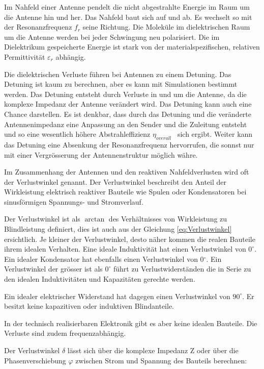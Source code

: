 Im Nahfeld einer Antenne pendelt die nicht abgestrahlte Energie im Raum um die Antenne hin und her. Das Nahfeld baut sich auf und ab. Es wechselt so mit der Resonanzfrequenz $f_r$ seine Richtung. Die Moleküle im dielektrischen Raum um die Antenne werden bei jeder Schwingung neu polarisiert.
Die im Dielektrikum gespeicherte Energie ist stark von der materialspezifischen, relativen Permittivität $\varepsilon_r $ abhängig. 

Die dielektrischen Verluste führen bei Antennen  zu einem Detuning. Das Detuning ist kaum zu berechnen, aber es kann mit Simulationen bestimmt werden. Das Detuning entsteht durch Verluste in und um die  Antenne, da die komplexe Impedanz der Antenne verändert wird. Das Detuning kann auch eine Chance darstellen. Es ist denkbar, dass durch das Detuning und die veränderte Antennenimpedanz eine Anpassung an den Sender und die Zuleitung entsteht und so eine wesentlich höhere Abstrahleffizienz $\eta_{overall}$ \ sich ergibt. Weiter kann das Detuning eine Absenkung der Resonanzfrequenz hervorrufen, die sonnst nur mit einer Vergrösserung der Antennenstruktur möglich währe.

Im Zusammenhang der Antennen und den reaktiven Nahfeldverlusten wird oft der Verlustwinkel genannt.  Der Verlustwinkel beschreibt den Anteil der Wirkleistung elektrisch reaktiver Bauteile wie Spulen oder Kondensatoren bei sinusförmigen Spannungs- und Stromverlauf. 

Der Verlustwinkel ist als $\arctan$ des Verhältnisses von Wirkleistung zu Blindleistung definiert, dies ist auch aus der Gleichung  \ref{eq:Verlustwinkel} ersichtlich. 
Je kleiner der Verlustwinkel, desto näher kommen die realen Bauteile ihrem idealen Verhalten. Eine ideale Induktivität hat einen Verlustwinkel von $0^\circ$. Ein idealer Kondensator hat ebenfalls einen Verlustwinkel von 0$^\circ$. Ein Verlustwinkel der grösser ist als $0^\circ$ führt zu Verlustwiderständen die in Serie zu den idealen Induktivitäten und Kapazitäten gerechte werden.

Ein idealer elektrischer Widerstand hat dagegen einen Verlustwinkel von $90^\circ$. Er besitzt keine kapazitiven oder induktiven Blindanteile.

In der technisch realisierbaren Elektronik gibt es aber keine idealen Bauteile. Die Verluste sind zudem frequenzabhängig.

Der Verlustwinkel  $\delta$  lässt sich über die komplexe Impedanz Z oder über die Phasenverschiebung  $\varphi$  zwischen Strom und Spannung des Bauteils berechnen: 

